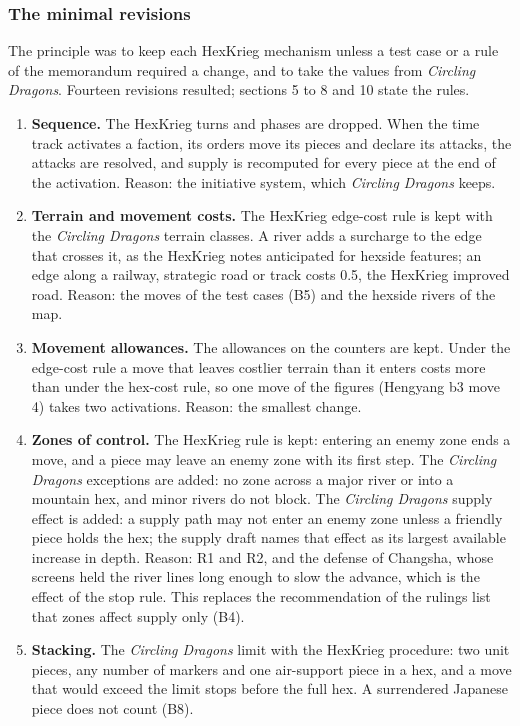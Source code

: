 \documentclass[11pt]{article}
\begin{document}
\subsubsection{The minimal revisions}\label{sub:revisions}
The principle was to keep each HexKrieg mechanism unless a test case or a rule of the memorandum required a change, and to take the values from \emph{Circling Dragons}. Fourteen revisions resulted; sections 5 to 8 and 10 state the rules.
\begin{enumerate}[label=M\arabic*.,leftmargin=*,itemsep=3pt]
\item \textbf{Sequence.} The HexKrieg turns and phases are dropped. When the time track activates a faction, its orders move its pieces and declare its attacks, the attacks are resolved, and supply is recomputed for every piece at the end of the activation. Reason: the initiative system, which \emph{Circling Dragons} keeps.
\item \textbf{Terrain and movement costs.} The HexKrieg edge-cost rule is kept with the \emph{Circling Dragons} terrain classes. A river adds a surcharge to the edge that crosses it, as the HexKrieg notes anticipated for hexside features; an edge along a railway, strategic road or track costs 0.5, the HexKrieg improved road. Reason: the moves of the test cases (B5) and the hexside rivers of the map.
\item \textbf{Movement allowances.} The allowances on the counters are kept. Under the edge-cost rule a move that leaves costlier terrain than it enters costs more than under the hex-cost rule, so one move of the figures (Hengyang b3 move 4) takes two activations. Reason: the smallest change.
\item \textbf{Zones of control.} The HexKrieg rule is kept: entering an enemy zone ends a move, and a piece may leave an enemy zone with its first step. The \emph{Circling Dragons} exceptions are added: no zone across a major river or into a mountain hex, and minor rivers do not block. The \emph{Circling Dragons} supply effect is added: a supply path may not enter an enemy zone unless a friendly piece holds the hex; the supply draft names that effect as its largest available increase in depth. Reason: R1 and R2, and the defense of Changsha, whose screens held the river lines long enough to slow the advance, which is the effect of the stop rule. This replaces the recommendation of the rulings list that zones affect supply only (B4).
\item \textbf{Stacking.} The \emph{Circling Dragons} limit with the HexKrieg procedure: two unit pieces, any number of markers and one air-support piece in a hex, and a move that would exceed the limit stops before the full hex. A surrendered Japanese piece does not count (B8).

\end{enumerate}
\end{document}
